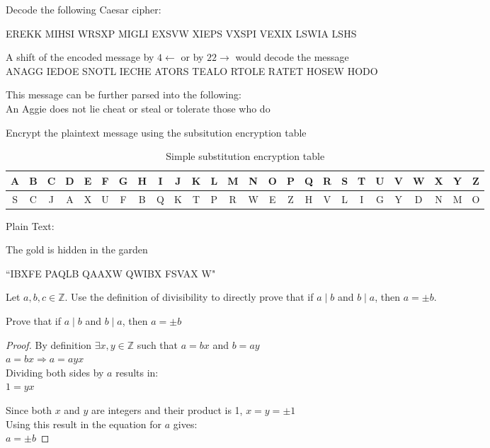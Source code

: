 \documentclass[12pt]{article}
\begin{document}
\thispagestyle{empty}
\problem Decode the following Caesar cipher:
\begin{center}
	EREKK MIHSI WRSXP MIGLI EXSVW XIEPS VXSPI VEXIX LSWIA LSHS
\end{center}

\solution
A shift of the encoded message by $4\leftarrow$ or by $22\rightarrow$ would decode the message\\
ANAGG IEDOE SNOTL IECHE ATORS TEALO RTOLE RATET HOSEW HODO

\noindent
This message can be further parsed into the following:\\
An Aggie does not lie cheat or steal or tolerate those who do

\problem Encrypt the plaintext message using the subsitution encryption table
\begin{table}[!ht]
	\centering
	\begin{tabular}{|c|c|c|c|c|c|c|c|c|c|c|c|c|c|c|c|c|c|c|c|c|c|c|c|c|c| }
		\hline
		A & B & C & D & E & F & G & H & I & J & K & L & M & N & O & P & Q & R & S & T & U & V & W & X & Y & Z \\
		\hline
		S & C & J & A & X & U & F & B & Q & K & T & P & R & W & E & Z & H & V & L & I & G & Y & D & N & M & O \\
		\hline
	\end{tabular}
	\caption{Simple substitution encryption table}
\end{table}

\noindent
Plain Text:
\begin{center}
	The gold is hidden in the garden
\end{center}

\solution
``IBXFE PAQLB QAAXW QWIBX FSVAX W"

\newpage
\problem Let $a,b,c\in\mathbb{Z}$. Use the definition of divisibility to directly prove that if $a\mid b$ and $b\mid a$, then $a=\pm b$.

\solution
Prove that if $a\mid b$ and $b\mid a$, then $a=\pm b$
\begin{proof}
	By definition $\exists x,y\in\mathbb{Z}$ such that $a=bx$ and $b=ay$\\
	$a = bx \Rightarrow a = ayx$\\
	Dividing both sides by $a$ results in:\\
	$1 = yx$

	\noindent
	Since both $x$ and $y$ are integers and their product is 1, $x=y=\pm 1$\\
	Using this result in the equation for $a$ gives:\\
	$a=\pm b$
\end{proof}
\end{document}
